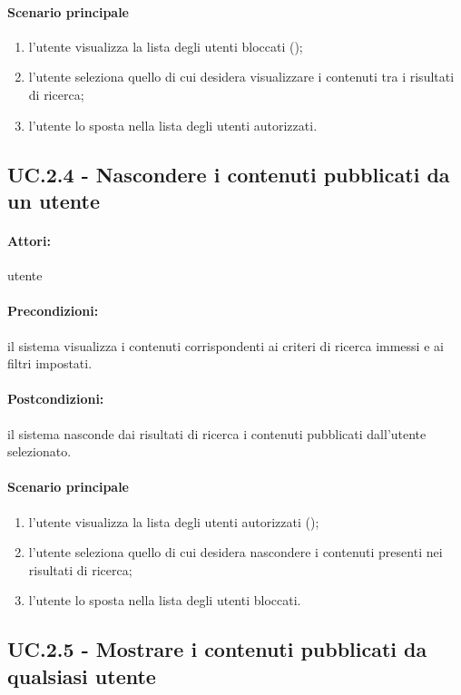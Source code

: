 \documentclass[10pt,a4paper,headinclude,footinclude,hidelinks]{scrreprt} %
\begin{document}
	\paragraph{Scenario principale}
	\begin{enumerate}
	\item l'utente visualizza la lista degli utenti bloccati ();
	\item l'utente seleziona quello di cui desidera visualizzare i contenuti tra i risultati di ricerca;
	\item l'utente lo sposta nella lista degli utenti autorizzati.
	\end{enumerate}

	\subsection[UC.2.4]{UC.2.4 - Nascondere i contenuti pubblicati da un utente}
	\label{sec:stage:ar:uc:2_4}
	\paragraph{Attori:} utente
	\paragraph{Precondizioni:} il sistema visualizza i contenuti corrispondenti ai criteri di ricerca immessi e ai filtri impostati.
	\paragraph{Postcondizioni:} il sistema nasconde dai risultati di ricerca i contenuti pubblicati dall'utente selezionato.
	\paragraph{Scenario principale}
	\begin{enumerate}
	\item l'utente visualizza la lista degli utenti autorizzati ();
	\item l'utente seleziona quello di cui desidera nascondere i contenuti presenti nei risultati di ricerca;
	\item l'utente lo sposta nella lista degli utenti bloccati.
	\end{enumerate}

	\subsection[UC.2.5]{UC.2.5 - Mostrare i contenuti pubblicati da qualsiasi utente}
	\label{sec:stage:ar:uc:2_5}
\end{document}
